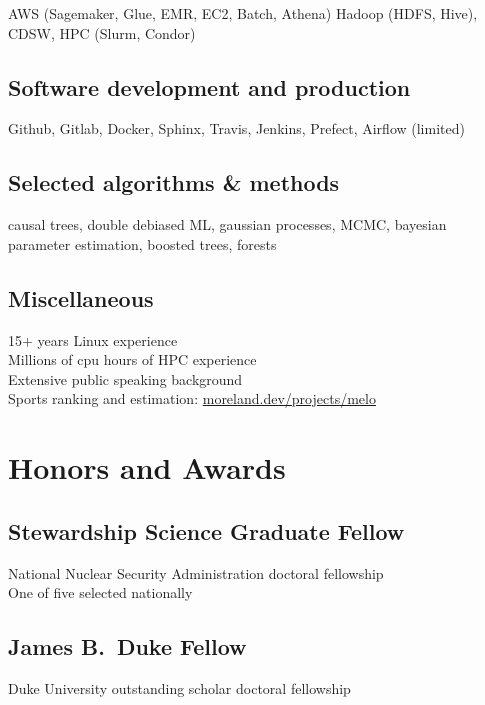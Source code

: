 \documentclass[letterpaper,10pt]{article}
\begin{document}
\begin{multicols}{2}
AWS (Sagemaker, Glue, EMR, EC2, Batch, Athena)
Hadoop (HDFS, Hive), CDSW, HPC (Slurm, Condor)

\subsection{Software development and production}
\smallskip

Github, Gitlab, Docker, Sphinx, Travis, Jenkins, Prefect, Airflow (limited)

\subsection{Selected algorithms \& methods}
\smallskip

causal trees, double debiased ML, gaussian processes, MCMC, bayesian parameter
estimation, boosted trees, forests

\subsection{Miscellaneous}
\smallskip

15+ years Linux experience\\
Millions of cpu hours of HPC experience\\
Extensive public speaking background \\
Sports ranking and estimation:
\href{https://moreland.dev/projects/melo}{moreland.dev/projects/melo}

\section{Honors and Awards}

\subsection{Stewardship Science Graduate Fellow}

National Nuclear Security Administration doctoral fellowship\\
One of five selected nationally

\subsection{James B.\ Duke Fellow}

Duke University outstanding scholar doctoral fellowship


\end{multicols}
\end{document}
